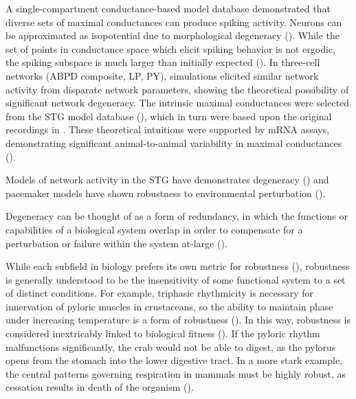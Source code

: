 \documentclass[14pt]{article}
\begin{document}
	A single-compartment conductance-based model database demonstrated that diverse sets of maximal conductances can produce spiking activity. Neurons can be approximated as isopotential due to morphological degeneracy (\cite{OtopalikSloppymorphologicaltuning2017}). While the set of points in conductance space which elicit spiking behavior is not ergodic, the spiking subspace is much larger than initially expected (\cite{PrinzAlternativehandtuningconductancebased2003,GoldmanGlobalStructureRobustness2001,GolowaschFailureaveragingconstruction2002}). In three-cell networks (ABPD composite, LP, PY), simulations elicited similar network activity from disparate network parameters, showing the theoretical possibility of significant network degeneracy. The intrinsic maximal conductances were selected from the STG model database (\cite{PrinzAlternativehandtuningconductancebased2003}), which in turn were based upon the original recordings in \cite{TurrigianoSelectiveregulationcurrent1995}. These theoretical intuitions were supported by mRNA assays, demonstrating significant animal-to-animal variability in maximal conductances (\cite{SchulzVariablechannelexpression2006,GoaillardFunctionalconsequencesanimaltoanimal2009,BucherAnimaltoanimalvariabilitymotor2005,HamoodAnimaltoanimalvariabilityneuromodulation2014}).
	
	Models of network activity in the STG have demonstrates degeneracy (\cite{PrinzSimilarnetworkactivity2004}) and pacemaker models have shown robustness to environmental perturbation (\cite{CaplanManyParameterSets2014}).
	
	Degeneracy can be thought of as a form of redundancy, in which the functions or capabilities of a biological system overlap in order to compensate for a perturbation or failure within the system at-large  (\cite{EdelmanDegeneracycomplexitybiological2001,WhitacreDegeneracydesignprinciple2010}).
	
	While each subfield in biology prefers its own metric for robustness (\cite{StellingRobustnessCellularFunctions2004}), robustness is generally understood to be the insensitivity of some functional system to a set of distinct conditions. For example, triphasic rhythmicity is necessary for innervation of pyloric muscles in crustaceans, so the ability to maintain phase under increasing temperature is a form of robustness (\cite{SoofiPhasemaintenancerhythmic2014}). In this way, robustness is considered inextricably linked to biological fitness (\cite{KitanoBiologicalrobustness2004}). If the pyloric rhythm malfunctions significantly, the crab would not be able to digest, as the pylorus opens from the stomach into the lower digestive tract. In a more stark example, the central patterns governing respiration in mammals must be highly robust, as cessation results in death of the organism (\cite{BellinghamDrivingrespirationrespiratory1998}).
	
\end{document}
